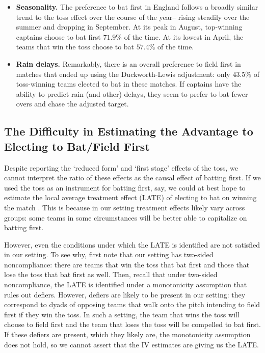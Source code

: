 \documentclass[12pt, letterpaper]{article}
\begin{document}
\begin{itemize}
\item \textbf{Seasonality.} The preference to bat first in England follows a broadly similar trend to the toss effect over the course of the year-- rising steadily over the summer and dropping in September. At its peak in August, top-winning captains choose to bat first $71.9\%$ of the time. At its lowest in April, the teams that win the toss choose to bat $57.4\%$ of the time.

\item \textbf{Rain delays.} Remarkably, there is an overall preference to field first in matches that ended up using the Duckworth-Lewis adjustment: only $43.5\%$ of toss-winning teams elected to bat in these matches. If captains have the ability to predict rain (and other) delays, they seem to prefer to bat fewer overs and chase the adjusted target.

\end{itemize}

\subsection{The Difficulty in Estimating the Advantage to Electing to Bat/Field First}

Despite reporting the `reduced form' and `first stage' effects of the toss, we cannot interpret the ratio of these effects as the causal effect of batting first. If we used the toss as an instrument for batting first, say, we could at best hope to estimate the local average treatment effect (LATE) of electing to bat on winning the match \citep{angrist1996identification}. This is because in our setting treatment effects likely vary across groups: some teams in some circumstances will be better able to capitalize on batting first.  

However, even the conditions under which the LATE is identified are not satisfied in our setting. To see why, first note that our setting has two-sided noncompliance: there are teams that win the toss that bat first and those that lose the toss that bat first as well. Then, recall that under two-sided noncompliance, the LATE is identified under a monotonicity assumption that rules out defiers. However, defiers are likely to be present in our setting: they correspond to dyads of opposing teams that walk onto the pitch intending to field first if they win the toss. In such a setting, the team that wins the toss will choose to field first and the team that loses the toss will be compelled to bat first. If these defiers are present, which they likely are, the monotonicity assumption does not hold, so we cannot assert that the IV estimates are giving us the LATE.
\end{document}
